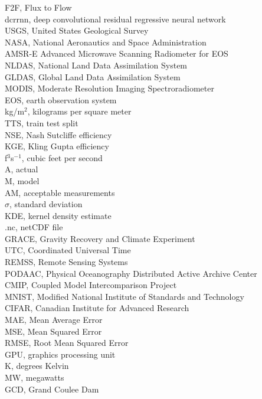 \startabbreviations
\noindent
F2F, Flux to Flow\\
dcrrnn, deep convolutional residual regressive neural network\\ 
USGS, United States Geological Survey\\ 
NASA, National Aeronautics and Space Administration \\ 
AMSR-E Advanced Microwave Scanning Radiometer for EOS \\ 
NLDAS, National Land Data Assimilation System\\ 
GLDAS, Global Land Data Assimilation System\\ 
MODIS, Moderate Resolution Imaging Spectroradiometer\\  
EOS, earth observation system\\ 
kg/m$^{2}$, kilograms per square meter\\ 
TTS, train test split\\ 
NSE, Nash Sutcliffe efficiency\\ 
KGE, Kling Gupta efficiency\\ 
f$^{3}$s$^{-1}$, cubic feet per second\\ 
A, actual\\ 
M, model\\ 
AM, acceptable measurements\\ 
$\sigma$, standard deviation\\ 
KDE, kernel density estimate\\ 
.nc, netCDF file\\ 
GRACE, Gravity Recovery and Climate Experiment\\ 
UTC, Coordinated Universal Time\\ 
REMSS, Remote Sensing Systems\\ 
PODAAC, Physical Oceanography Distributed Active Archive Center \\
CMIP, Coupled Model Intercomparison Project\\ 
MNIST, Modified National Institute of Standards and Technology \\
CIFAR, Canadian Institute for Advanced Research\\ 
MAE, Mean Average Error\\ 
MSE, Mean Squared Error\\ 
RMSE, Root Mean Squared Error\\
GPU, graphics processing unit\\ 
K, degrees Kelvin\\ 
MW, megawatts\\ 
GCD, Grand Coulee Dam\\ 
